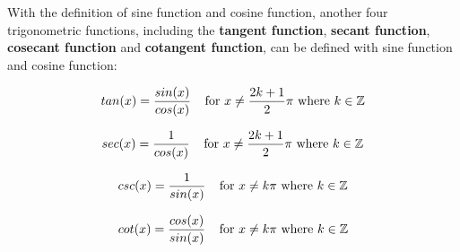 \documentclass[a4paper,12pt]{article}
\begin{document}
\begin{dft}
  With the definition of sine function and cosine function, another four trigonometric functions, including the \textbf{tangent function}, \textbf{secant function}, \textbf{cosecant function} and \textbf{cotangent function}, can be defined with sine function and cosine function:

  $$tan(x)=\frac{sin(x)}{cos(x)}\;\;\;\;\text{for }x\neq \frac{2k+1}{2}\pi \text{ where }k\in \mathbb{Z}$$\s

  $$sec(x)=\frac{1}{cos(x)}\;\;\;\;\text{for }x\neq \frac{2k+1}{2}\pi \text{ where }k\in \mathbb{Z}$$\s

  $$csc(x)=\frac{1}{sin(x)}\;\;\;\;\text{for }x\neq k\pi \text{ where }k\in \mathbb{Z}$$\s

  $$cot(x)=\frac{cos(x)}{sin(x)}\;\;\;\;\text{for }x\neq k\pi \text{ where }k\in \mathbb{Z}$$
\end{dft}
\end{document}
